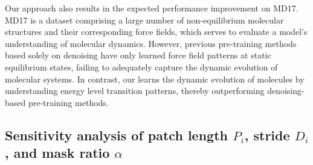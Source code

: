 Our approach also results in the expected performance improvement on MD17. MD17 is a dataset comprising a large number of non-equilibrium molecular structures and their corresponding force fields, which serves to evaluate a model's understanding of molecular dynamics. However, previous pre-training methods based solely on denoising have only learned force field patterns at static equilibrium states, failing to adequately capture the dynamic evolution of molecular systems. In contrast, our \themodel learns the dynamic evolution of molecules by understanding energy level transition patterns, thereby outperforming denoising-based pre-training methods.

\subsection{Sensitivity analysis of patch length $P_i$, stride $D_i$, and mask ratio $\alpha$}\label{sec:sensitivity}
\vspace{-7pt}
